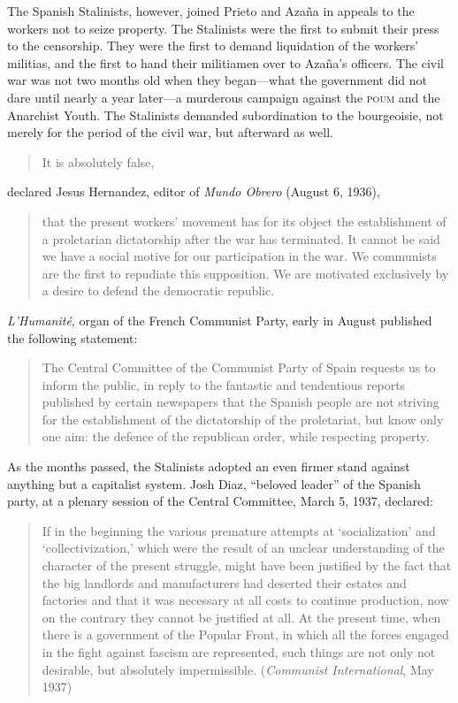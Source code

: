 The Spanish Stalinists, however, joined Prieto and Azaña in appeals to the workers not to seize property. The Stalinists were the first to submit their press to the censorship. They were the first to demand liquidation of the workers’ militias, and the first to hand their militiamen over to Azaña’s officers. The civil war was not two months old when they began---what the government did not dare until nearly a year later---a murderous campaign against the \textsc{poum} and the Anarchist Youth. The Stalinists demanded subordination to the bourgeoisie, not merely for the period of the civil war, but afterward as well.

\begin{quotation}
  It is absolutely false,
\end{quotation}
declared Jesus Hernandez, editor of \emph{Mundo Obrero} (August 6, 1936),

\begin{quotation}
  \noindent
  that the present workers’ movement has for its object the establishment of a proletarian dictatorship after the war has terminated. It cannot be said we have a social motive for our participation in the war. We communists are the first to repudiate this supposition. We are motivated exclusively by a desire to defend the democratic republic.
\end{quotation}

\emph{L’Humanité}, organ of the French Communist Party, early in August published the following statement:

\begin{quotation}
  The Central Committee of the Communist Party of Spain requests us to inform the public, in reply to the fantastic and tendentious reports published by certain newspapers that the Spanish people are not striving for the establishment of the dictatorship of the proletariat, but know only one aim: the defence of the republican order, while respecting property.
\end{quotation}

As the months passed, the Stalinists adopted an even firmer stand against anything but a capitalist system. Josh Diaz, ``beloved leader'' of the Spanish party, at a plenary session of the Central Committee, March 5, 1937, declared:

\begin{quotation}
  If in the beginning the various premature attempts at ‘socialization’ and ‘collectivization,’ which were the result of an unclear understanding of the character of the present struggle, might have been justified by the fact that the big landlords and manufacturers had deserted their estates and factories and that it was necessary at all costs to continue production, now on the contrary they cannot be justified at all. At the present time, when there is a government of the Popular Front, in which all the forces engaged in the fight against fascism are represented, such things are not only not desirable, but absolutely impermissible. (\emph{Communist International}, May 1937)
\end{quotation}

